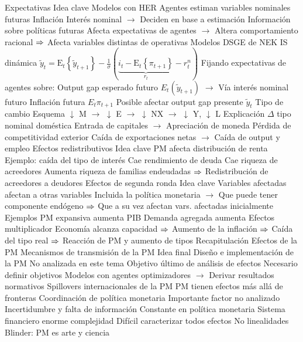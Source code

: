 \documentclass{nuevotema}
\begin{document}
\begin{esquemal}
		\2 Expectativas
			\3 Idea clave
				\4 Modelos con HER
				\4 Agentes estiman variables nominales futuras
				\4[] Inflación
				\4[] Interés nominal
				\4[] $\to$ Deciden en base a estimación
				\4 Información sobre políticas futuras
				\4[] Afecta expectativas de agentes
				\4[] $\to$ Altera comportamiento racional
				\4[] $\then$ Afecta variables distintas de operativas
			\3 Modelos DSGE de NEK
				\4 IS dinámica
				\4[] $\tilde{y}_t = \textrm{E}_t \left\lbrace \tilde{y}_{t+1} \right\rbrace - \frac{1}{\sigma} \left( \underbrace{i_t - \textrm{E}_t \left\lbrace \pi_{t+1} \right\rbrace}_{r_t} - r^n_t \right) $
				\4 Fijando expectativas de agentes sobre:
				\4[] Output gap esperado futuro $E_t(\tilde{y}_{t+1})$
				\4[] $\to$ Vía interés nominal futuro
				\4[] Inflación futura $E_t{\pi_{t+1}}$
				\4[$\then$] Posible afectar output gap presente $\tilde{y}_t$
		\2 Tipo de cambio
			\3 Esquema
				\4[] $\downarrow$ M $\to$ $\downarrow$ E $\to$ $\downarrow$ NX $\to$ $\downarrow$ Y, $\downarrow$ L
			\3 Explicación
				\4 $\Delta$ tipo nominal doméstica
				\4[] Entrada de capitales
				\4[] $\to$ Apreciación de moneda
				\4 Pérdida de competitividad exterior
				\4[] Caída de exportaciones netas
				\4[] $\to$ Caída de output y empleo
		\2 Efectos redistributivos
			\3 Idea clave
				\4 PM afecta distribución de renta
				\4 Ejemplo: caída del tipo de interés
				\4[] Cae rendimiento de deuda
				\4[] Cae riqueza de acreedores
				\4[] Aumenta riqueza de familias endeudadas
				\4[] $\then$ Redistribución de acreedores a deudores
		\2 Efectos de segunda ronda
			\3 Idea clave
				\4 Variables afectadas afectan a otras variables
				\4[] Incluida la política monetaria
				\4[] $\to$ Que puede tener componente endógeno
				\4[] $\then$ Que a su vez afectan vars. afectadas inicialmente
			\3 Ejemplos
				\4 PM expansiva aumenta PIB
				\4 Demanda agregada aumenta
				\4[] Efectos multiplicador
				\4 Economía alcanza capacidad
				\4[] $\then$ Aumento de la inflación
				\4[] $\then$ Caída del tipo real
				\4[] $\then$ Reacción de PM y aumento de tipos
	\1[] 
		\2 Recapitulación
			\3 Efectos de la PM
			\3 Mecanismos de transmisión de la PM
		\2 Idea final
			\3 Diseño e implementación de la PM
				\4 No analizada en este tema
				\4 Objetivo último de análisis de efectos
				\4 Necesario definir objetivos
				\4[] Modelos con agentes optimizadores
				\4[] $\to$ Derivar resultados normativos
			\3 Spillovers internacionales de la PM
				\4 PM tienen efectos más allá de fronteras
				\4 Coordinación de política monetaria
				\4[] Importante factor no analizado
			\3 Incertidumbre y falta de información
				\4 Constante en política monetaria
				\4 Sistema financiero enorme complejidad
				\4 Difícil caracterizar todos efectos
				\4 No linealidades
				\4[$\to$] Blinder: PM es arte y ciencia
\end{esquemal}
\end{document}
